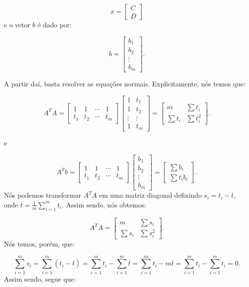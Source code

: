 $$
x = \begin{bmatrix}
	C \\
	D
\end{bmatrix}
$$
e o vetor $b$ é dado por:

$$
b = \begin{bmatrix}
	b_1 \\
	b_2 \\
	\vdots \\
	b_m
\end{bmatrix}.
$$

A partir daí, basta resolver as equações normais. Explicitamente, nós temos que:

$$
A^TA = \begin{bmatrix}
	1 & 1 & \cdots & 1 \\
	t_1 & t_2 & \cdots & t_m
\end{bmatrix}\begin{bmatrix}
	1 & t_1 \\
	1 & t_2 \\
	\vdots & \vdots \\
	1 & t_m
\end{bmatrix} = \begin{bmatrix}
	m & \sum t_i \\
	\sum t_i & \sum t_i^2
\end{bmatrix}.
$$

e

$$
A^Tb = \begin{bmatrix}
	1 & 1 & \cdots & 1\\
	t_1 & t_2 & \cdots & t_m
\end{bmatrix}\begin{bmatrix}
	b_1 \\
	b_2 \\
	\vdots \\
	b_m
\end{bmatrix} = \begin{bmatrix}
	\sum b_i \\
	\sum t_ib_i
\end{bmatrix}.
$$
Nós podemos transformar $A^TA$ em uma matriz diagonal definindo $s_i = t_i - \overline{t}$, onde $\overline{t} = \frac{1}{m}\sum\limits_{i = 1}^{m} t_i$. Assim sendo, nós obtemos:

$$
A^TA = \begin{bmatrix}
	m & \sum s_i \\
	\sum s_i & \sum s_i^2
\end{bmatrix}.
$$
Nós temos, porém, que:

$$
\sum\limits_{i = 1}^{m} s_i = \sum\limits_{i = 1}^{m}(t_i - \overline{t}) = \sum\limits_{i = 1}^{m} t_i - \sum\limits_{i = 1}^{m}\overline{t} = \sum\limits_{i = 1}^{m} t_i - m\overline{t} = \sum\limits_{i = 1}^{m} t_i - \sum\limits_{i = 1}^{m} t_i = 0.
$$
Assim sendo, segue que:

